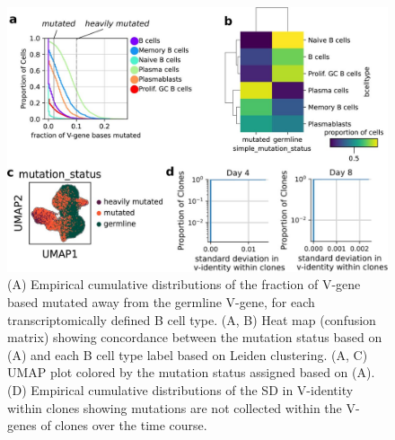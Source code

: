 \begin{figure}[hbt!]
\centering
\includegraphics[width=14cm, keepaspectratio]{figs/paper2/figs2_bcd.jpg}
\caption[Validation of population based lineage inference.]{(A) Empirical cumulative distributions of the fraction of V-gene based mutated away from the germline V-gene, for each transcriptomically defined B cell type. (A, B) Heat map (confusion matrix) showing concordance between the mutation status based on (A) and each B cell type label based on Leiden clustering. (A, C) UMAP plot colored by the mutation status assigned based on (A). (D) Empirical cumulative distributions of the SD in V-identity within clones showing mutations are not collected within the V-genes of clones over the time course.}
\label{fig:paper2_fig_s2}
\end{figure}

